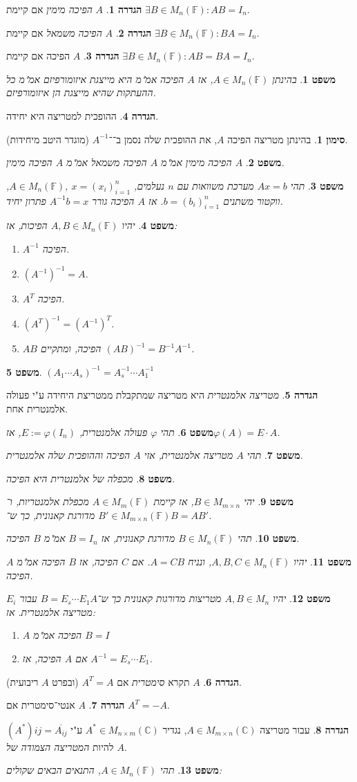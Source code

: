 \documentclass[]{article}
\newcommand\C     {\mathbb{C}}
\newcommand\ol    {\overline}
\newcommand\F         {\mathbb{F}}
\newcommand\co        {\colon}
\newcommand\op    {^{-1}}
\renewcommand\phi     {\varphi}
\newtheorem{Theorem}{משפט}
\theoremstyle{definition}
\newtheorem{definition}{הגדרה}
\newtheorem{Notion}{סימון}
\newcommand\theo  [1] {\begin{Theorem}#1\end{Theorem}}
\newcommand\defi  [1] {\begin{definition}#1\end{definition}}
\newcommand\noti  [1] {\begin{Notion}#1\end{Notion}}
\begin{document}
\begin{multicols}{2}
		\defi{$A$ \textit{הפיכה מימין} אם קיימת $\exists B \in M_{n}(\F) \co AB = I_n$. }
		\defi{$A$ \textit{הפיכה משמאל} אם קיימת $\exists B \in M_{n}(\F) \co BA = I_n$. }
		\defi{$A$ הפיכה אם קיימת $\exists B \in M_{n}(\F) \co AB = BA = I_n$. }
		\theo{בהינתן $A \in M_n(\F)$, אז $A$ הפיכה אמ"מ היא מייצגת איזומורפיזם אמ"מ כל ההעתקות שהיא מייצגת הן איזומורפיזם. }
		\defi{ההופכית למטריצה היא יחידה. }
		\noti{בהינתן מטריצה הפיכה $A$, את ההופכית שלה נסמן ב־־$A\op$ (מוגדר היטב מיחידות). }
		\theo{$A$ הפיכה מימין אמ"מ $A$ הפיכה משמאל אמ"מ $A$ הפיכה מימין. }
		\theo{תהי $Ax = b$ מערכת משוואות עם $n$ נעלמים, $A \in M_{n}(\F), \ x = (x_i)^n_{i = 1}$, ווקטור משתנים $b = (b_i)_{i = 1}^n$. אז $A$ הפיכה גורר $A\op b = x$ פתרון יחיד. }
		\theo{יהיו $A, B \in M_{n}(\F)$ הפיכות, אז: 
		\begin{enumerate}
			\item $A\op$ הפיכה. 
			\item $(A\op)\op =A$. 
			\item $A^T$ הפיכה. 
			\item $(A^T)\op = (A\op)^T$. 
			\item $AB$ הפיכה, ומתקיים $(AB)\op = B\op A\op$. 
		\end{enumerate}}
		\theo{\hfil $(A_1 \cdots A_s)\op = A_s\op \cdots A_1 \op$}
		\defi{\textit{מטריצה אלמנטרית} היא מטריצה שמתקבלת ממטריצת היחידה ע"י פעולה אלמנטרית אחת. }
		\theo{תהי $\phi$ פעולה אלמנטרית, $E := \phi(I_n)$, אז$\phi(A) = E \cdot A$. }
		\theo{תהי $A$ מטריצה אלמנטרית, אזי $A$ הפיכה וההופכית שלה אלמנטרית. }
		\theo{מכפלה של אלמנטרית היא הפיכה. }
		\theo{יהי $B \in M_{m \times n}$, אז קיימת $A \in M_{m}(\F)$ מכפלת אלמנטריות, ו־$B' \in M_{m \times n}(\F)$ מדורגת קאנונית, כך ש־$B = AB'$. }
		\theo{תהי $B \in M_{n}(\F)$ מדורגת קאנונית, אז $B = I_n$ אמ"מ $B$ הפיכה. }
		\theo{יהיו $A, B, C \in M_n(\F)$, ונניח $A = CB$. אם $C$ הפיכה, אז $B$ הפיכה אמ"מ $A$ הפיכה. }
		\theo{יהיו $A, B  \in M_n$ מטריצות מדורגות קאנונית כך ש־$B = E_s \cdots E_1A$ עבור $E_i$ מטריצה אלמנטרית. אז: 
		\begin{enumerate}
			\item $A$ הפיכה אמ"מ $B = I$
			\item אם $A$ הפיכה, אז $A\op = E_s \cdots E_1$. 
		\end{enumerate}}
		\defi{$A$ תקרא \textit{סימטרית} אם $A^T = A$ (ובפרט $A$ ריבועית). }
		\defi{$A$ אנטי־סימטרית אם $A^T = -A$. }
		\defi{עבור מטריצה $A \in M_{m \times n}(\C)$, נגדיר $A^* \in M_{n \times m}(\C)$ ע"י $(A^*){ij} = \ol{A_{ij}}$ להיות \textit{המטריצה הצמודה של $A$}. }
		\theo{תהי $A \in M_n(\F)$, התנאים הבאים שקולים: 
}
\end{multicols}
\end{document}
